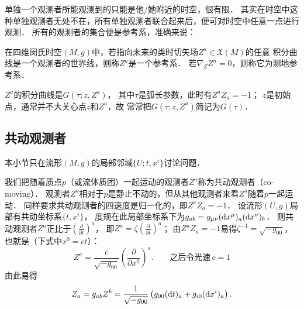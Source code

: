 

单独一个观测者所能观测到的只能是他/她附近的时空，很有限．
其实在时空中这种单独观测者无处不在，所有单独观测者联合起来后，便可对时空中任意一点进行观测．
所有的观测者的集合便是参考系，准确来说：

\begin{definition}\label{chfd:def_reference-frame}
    在四维闵氏时空$(M,g)$中，若指向未来的类时切矢场$Z^a\in \mathfrak{X}(M)$的任意
    积分曲线是一个观测者的世界线，则称$Z^a$是一个{\heiti 参考系}．
    若$\nabla_Z Z^a=0$，则称它为{\heiti 测地参考系}．
\end{definition}

$Z^a$的积分曲线是$G(\tau ;z,Z^a)$，
其中$\tau$是弧长参数，此时有$Z^a Z_a=-1$；
$z$是初始点，通常并不大关心点$z$和$Z^a$，故
常常把$G(\tau ;z,Z^a)$简记为$G(\tau)$．



\subsection{共动观测者}\label{chfd:sec_comoving}
本小节只在流形$(M,g)$的局部邻域$\{U;t,x^i\}$讨论问题．

我们把随着质点$p$（或流体质团）一起运动的观测者$Z^a$称为{\heiti 共动观测者}（co-moving）．
观测者$Z^a$相对于$p$是静止不动的，但从其他观测者来看$Z^a$随着$p$一起运动．
同样要求共动观测者的四速度是归一化的，即$Z^a Z_a=-1$．
设流形$(U,g)$局部有共动坐标系$\{t,x^i\}$，
度规在此局部坐标系下为$g_{ab}=g_{\mu\nu}({\rm d}x^\mu)_a ({\rm d}x^\nu)_b$．
则共动观测者$Z^a$正比于$(\frac{\partial}{\partial t})^a$，
即$Z^a= \zeta (\frac{\partial}{\partial t})^a$；
由$Z^a Z_a=-1$易得$\zeta^{-1}=\sqrt{-g_{00}}$，也就是（下式中$x^0=ct$）：
\begin{equation}\label{chfd:eqn_CM-Zu}
    Z^a= \frac{c}{\sqrt{-g_{00}}} \left(\frac{\partial}{\partial x^0}\right)^a .
    \qquad \text{之后令光速} \,  c=1 
\end{equation}
由此易得
\begin{equation}\label{chfd:eqn_CM-Zd}
    Z_a= g_{ab}Z^b =\frac{1}{\sqrt{-g_{00}}}\left(
    g_{00}({\rm d}t)_a + g_{i0} ({\rm d}x^i)_a\right) .
\end{equation}

